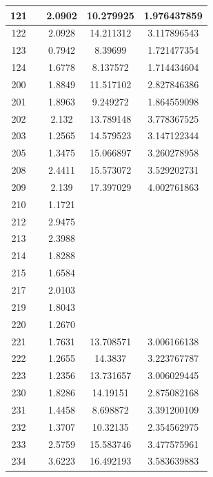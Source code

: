 \begin{table}[!tp]
\begin{tabular}{|c|c|c|c|c|}
		121 & & 2.0902 & 10.279925 & 1.976437859\\ \hline
		122 & & 2.0928 & 14.211312 & 3.117896543\\ \hline
		123 & & 0.7942 &  8.39699  & 1.721477354\\ \hline
		124 & & 1.6778 &  8.137572 & 1.714434604\\ \hline
		200 & & 1.8849 & 11.517102 & 2.827846386\\ \hline
		201 & & 1.8963 &  9.249272 & 1.864559098\\ \hline
		202 & & 2.132  & 13.789148 & 3.778367525\\ \hline
		203 & & 1.2565 & 14.579523 & 3.147122344\\ \hline
		205 & & 1.3475 & 15.066897 & 3.260278958\\ \hline
		208 & & 2.4411 & 15.573072 & 3.529202731\\ \hline
		209 & & 2.139  & 17.397029 & 4.002761863\\ \hline	
		210 & & 1.1721 &  & \\ \hline
		212 & & 2.9475 &  & \\ \hline
		213 & & 2.3988 &  & \\ \hline
		214 & & 1.8288 &  & \\ \hline
		215 & & 1.6584 &  & \\ \hline
		217 & & 2.0103 &  & \\ \hline
		219 & & 1.8043 &  & \\ \hline
		220 & & 1.2670 &  & \\ \hline		
		221 & & 1.7631 & 13.708571 & 3.006166138\\ \hline
		222 & & 1.2655 & 14.3837   & 3.223767787\\ \hline
		223 & & 1.2356 & 13.731657 & 3.006029445\\ \hline
		230 & & 1.8286 & 14.19151  & 2.875082168\\ \hline
		231 & & 1.4458 &  8.698872 & 3.391200109\\ \hline
		232 & & 1.3707 & 10.32135  & 2.354562975\\ \hline
		233 & & 2.5759 & 15.583746 & 3.477575961\\ \hline
		234 & & 3.6223 & 16.492193 & 3.583639883\\ \hline
	\end{tabular}
\end{table}


